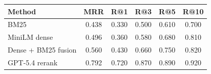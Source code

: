 \begin{tabular}{lccccc}
\toprule
Method & MRR & R@1 & R@3 & R@5 & R@10 \\
\midrule
BM25 & 0.438 & 0.330 & 0.500 & 0.610 & 0.700 \\
MiniLM dense & 0.496 & 0.360 & 0.580 & 0.680 & 0.810 \\
Dense + BM25 fusion & 0.560 & 0.430 & 0.660 & 0.750 & 0.820 \\
GPT-5.4 rerank & 0.792 & 0.720 & 0.870 & 0.890 & 0.920 \\
\bottomrule
\end{tabular}
